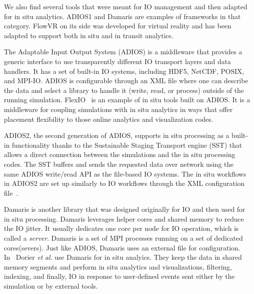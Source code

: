 We also find several tools that were meant for IO management and then adapted for in situ analytics. ADIOS1\cite{lofstead_insights_2013_adios, jin2008adaptive_adios, boyuka_transparent_2014_adios, in_situ_methodes} and Damaris\cite{dorier_damaris_2012} 
are examples of frameworks in that category. FlowVR\cite{dreher_flexible_2014} on its side was developed for virtual reality and has been adapted to support both in situ and in transit analytics.

The Adaptable Input Output System (ADIOS) is a middleware that provides a generic interface to use transparently different IO transport layers and data handlers.
It has a set of built-in IO systems, including HDF5, NetCDF, POSIX, and MPI-IO.
ADIOS is configurable through an XML file where one can describe the data and select a library to handle it (write, read, or process) outside of the running simulation. 
FlexIO~\cite{zheng_flexio_nodate} is an example of in situ tools built on ADIOS. It is a middleware for coupling simulations with in situ analytics in ways that offer placement flexibility to those online analytics and visualization codes. 

ADIOS2,  the second generation of ADIOS, supports in situ processing as a built-in functionality thanks to the  Sustainable Staging Transport engine (SST) that allows a direct connection between the simulations and the in situ processing codes. The SST buffers and sends the requested data over network using the same ADIOS write/read API as the file-based IO systems. The in situ workflows in ADIOS2 are set up similarly to IO workflows through the XML configuration file~\cite{laufer2022high_adios2_insitu}.

Damaris\cite{dorier_damaris_2012, dorier_damaris_2012_tech_report} is another library that was designed originally for IO and then used for in situ processing. Damaris leverages helper cores and shared memory to reduce the IO jitter. It usually dedicates one core per node for IO operation, which is called a \textit{server}. 
Damaris is a set of MPI processes running on a set of dedicated cores(severs). Just like ADIOS, Damaris uses an external file for configuration. In~\cite{dorier_addressing_2014, dorier_lessons_2015, dorier_damaris, damaris_viz} Dorier \textit{et al.} use Damaris for in situ analyics. They keep the data in shared memory segments and perform in situ analytics and visualizations, filtering, indexing, and finally, IO in response to user-defined events sent either by the simulation or by external tools.  

